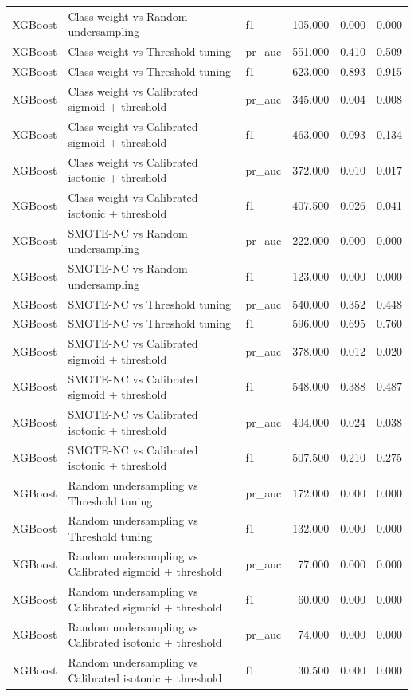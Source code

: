 \begin{tabular}{lllrrr}
XGBoost & Class weight vs Random undersampling & f1 & 105.000 & 0.000 & 0.000 \\
XGBoost & Class weight vs Threshold tuning & pr_auc & 551.000 & 0.410 & 0.509 \\
XGBoost & Class weight vs Threshold tuning & f1 & 623.000 & 0.893 & 0.915 \\
XGBoost & Class weight vs Calibrated sigmoid + threshold & pr_auc & 345.000 & 0.004 & 0.008 \\
XGBoost & Class weight vs Calibrated sigmoid + threshold & f1 & 463.000 & 0.093 & 0.134 \\
XGBoost & Class weight vs Calibrated isotonic + threshold & pr_auc & 372.000 & 0.010 & 0.017 \\
XGBoost & Class weight vs Calibrated isotonic + threshold & f1 & 407.500 & 0.026 & 0.041 \\
XGBoost & SMOTE-NC vs Random undersampling & pr_auc & 222.000 & 0.000 & 0.000 \\
XGBoost & SMOTE-NC vs Random undersampling & f1 & 123.000 & 0.000 & 0.000 \\
XGBoost & SMOTE-NC vs Threshold tuning & pr_auc & 540.000 & 0.352 & 0.448 \\
XGBoost & SMOTE-NC vs Threshold tuning & f1 & 596.000 & 0.695 & 0.760 \\
XGBoost & SMOTE-NC vs Calibrated sigmoid + threshold & pr_auc & 378.000 & 0.012 & 0.020 \\
XGBoost & SMOTE-NC vs Calibrated sigmoid + threshold & f1 & 548.000 & 0.388 & 0.487 \\
XGBoost & SMOTE-NC vs Calibrated isotonic + threshold & pr_auc & 404.000 & 0.024 & 0.038 \\
XGBoost & SMOTE-NC vs Calibrated isotonic + threshold & f1 & 507.500 & 0.210 & 0.275 \\
XGBoost & Random undersampling vs Threshold tuning & pr_auc & 172.000 & 0.000 & 0.000 \\
XGBoost & Random undersampling vs Threshold tuning & f1 & 132.000 & 0.000 & 0.000 \\
XGBoost & Random undersampling vs Calibrated sigmoid + threshold & pr_auc & 77.000 & 0.000 & 0.000 \\
XGBoost & Random undersampling vs Calibrated sigmoid + threshold & f1 & 60.000 & 0.000 & 0.000 \\
XGBoost & Random undersampling vs Calibrated isotonic + threshold & pr_auc & 74.000 & 0.000 & 0.000 \\
XGBoost & Random undersampling vs Calibrated isotonic + threshold & f1 & 30.500 & 0.000 & 0.000 \\

\end{tabular}
